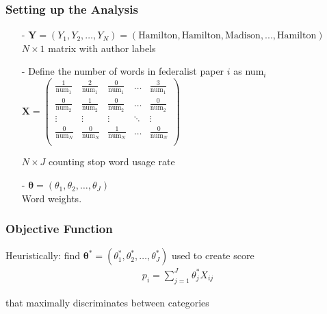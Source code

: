 \documentclass{beamer}
\numberwithin{equation}{section}
\begin{document}
\begin{frame}
\frametitle{Setting up the Analysis}

\begin{itemize}
\item[-] $\boldsymbol{Y} = (Y_{1}, Y_{2}, \hdots, Y_{N}) = (\text{Hamilton}, \text{Hamilton}, \text{Madison}, ..., \text{Hamilton})  $ \\ $N \times 1$ matrix with author labels
\item[-] Define the number of words in federalist paper $i$ as num$_{i}$
$\boldsymbol{X} = \begin{pmatrix}
\frac{1}{\text{num}_{1}}  & \frac{2}{\text{num}_{1}} & \frac{0}{\text{num}_{1}} & \hdots & \frac{3}{\text{num}_{1}}\\
\frac{0}{\text{num}_{2}} & \frac{1}{\text{num}_{2}} & \frac{0}{\text{num}_{2}} & \hdots & \frac{0}{\text{num}_{2}} \\
\vdots & \vdots & \vdots& \ddots & \vdots \\
\frac{0}{\text{num}_{N}} & \frac{0}{\text{num}_{N}} & \frac{1}{\text{num}_{N}} & \hdots & \frac{0}{\text{num}_{N}} \\
\end{pmatrix}$

 $N \times J$ counting stop word usage rate
\item[-] $\boldsymbol{\theta} = (\theta_{1}, \theta_{2}, \hdots, \theta_{J})$ \\ Word weights.\\
\end{itemize}





\end{frame}




\begin{frame}
\frametitle{Objective Function}


\alert{Heuristically}: find $\boldsymbol{\theta}^{*} = (\theta_{1}^{*}, \theta_{2}^{*}, \hdots, \theta_{J}^{*}) $ used to create score
\begin{eqnarray}
p_{i}  = \sum_{j=1}^{J} \theta_{j}^{*} X_{ij} \nonumber
\end{eqnarray}

 that maximally discriminates between categories






\end{frame}
\end{document}
